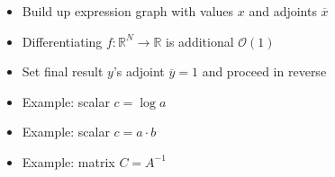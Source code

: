 \documentclass[10pt]{report}
\begin{document}
\begin{itemize}
\item Build up expression graph with values $x$ and adjoints $\overline{x}$
\item Differentiating $f:\mathbb{R}^N \rightarrow \mathbb{R}$ is additional $\mathcal{O}(1)$
\item Set final result $y$'s adjoint $\overline{y} = 1$ and proceed in reverse
\item Example:  scalar $c = \log a$
\item Example: scalar $c = a \cdot b$
\item Example: matrix $C = A^{-1}$
\begin{subitemize}
\item $\overline{A} \ {+}{=} \ -C^{\top} \cdot \overline{C} \cdot C^{\top}$
\end{subitemize}
\end{itemize}
\end{document}
